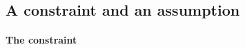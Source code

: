 


\subsection{A constraint and an assumption}
\label{sec:assumptions-1}


\paragraph{The constraint}


